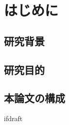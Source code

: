 \documentclass{jsarticle}
\begin{document}
    \fi

    \section{はじめに}

    \subsection{研究背景}
    \subsection{研究目的}
    \subsection{本論文の構成}


    \expandafter\ifx\csname ifdraft\endcsname\relax
\end{document}
